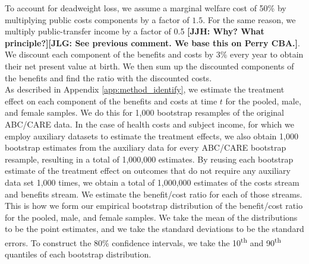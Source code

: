 \noindent To account for deadweight loss, we assume a marginal welfare cost of 50\% by multiplying
public costs components by a factor of $1.5$. For the same reason, we multiply public-transfer
income by a factor of 0.5 \textbf{[JJH: Why? What principle?]}\textbf{[JLG: See previous comment. We base this on Perry CBA.]}. We discount each component of the benefits and costs
by 3\% every year to obtain their net present value at birth. We then sum up the discounted
components of the benefits and find the ratio with the discounted costs. \\

\noindent As described in Appendix \ref{app:method_identify}, we estimate the treatment effect on each
component of the benefits and costs at time $t$ for the pooled, male, and
female samples. We do this for 1,000 bootstrap resamples of the original ABC/CARE data.
In the case of health costs and subject income, for which we employ auxiliary datasets to
estimate the treatment effects, we also obtain 1,000 bootstrap estimates from the auxiliary data
for every ABC/CARE bootstrap resample, resulting in a total of 1,000,000 estimates.
By reusing each bootstrap estimate of the treatment effect on outcomes that do not require any auxiliary data
set 1,000 times, we obtain a total of 1,000,000 estimates of the costs stream and benefits stream.
We estimate the benefit/cost ratio for each of those streams.
This is how we form our empirical bootstrap distribution of the benefit/cost ratio for the pooled, male, and female samples.
We take the mean of the distributions to be the point estimates, and we take the standard deviations
to be the standard errors. To construct the 80\% confidence intervals, we take the 10\textsuperscript{th}
and 90\textsuperscript{th} quantiles of each bootstrap distribution.




